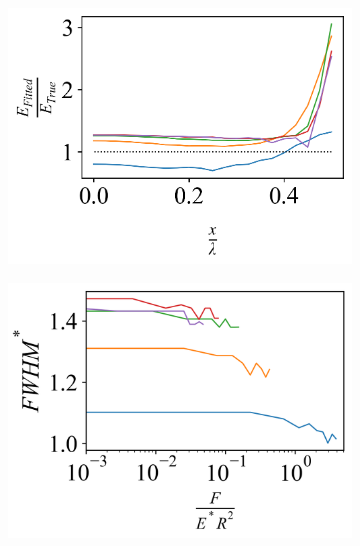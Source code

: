\begin{figure}[H]
    \begin{subfigure}[t]{0.325\textwidth}
        \centering
        \caption{\label{fig: Wave-Youngs} }
        \includegraphics[width=1\linewidth]{Figures/Wave-Youngs.png}
    \end{subfigure}
     \hfill
    \begin{subfigure}[t]{0.325\textwidth}
        \centering
        \caption{\label{fig: Wave-FWHM} }
        \includegraphics[width=1\linewidth]{Figures/Wave-FWHM.png}
    \end{subfigure}    
     \hfill
    \begin{subfigure}[t]{0.325\textwidth}
        \centering
        \caption{\label{fig: Wave-Volume} }

\end{subfigure}
\end{figure}
